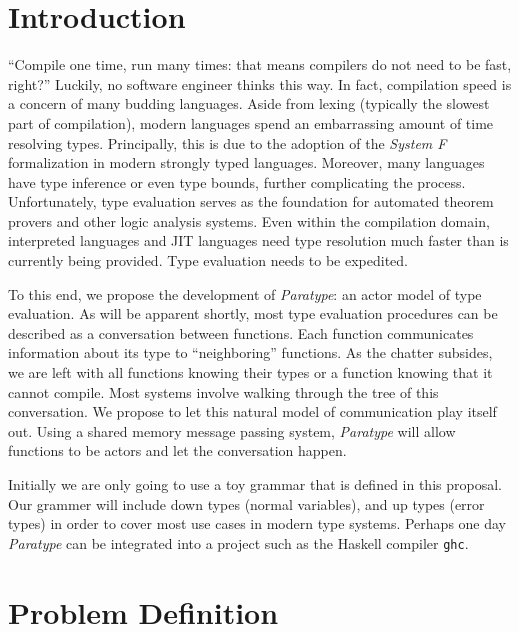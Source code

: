 \documentclass{acm_proc_article-sp}
\begin{document}


\section{Introduction}


``Compile one time, run many times: that means compilers do not need to be
fast, right?'' Luckily, no software engineer thinks this way. In fact,
compilation speed is a concern of many budding languages. Aside from lexing
(typically the slowest part of compilation), modern
languages spend an embarrassing amount of time resolving
types. Principally, this is due to the adoption of the
\emph{System F} formalization in modern strongly typed languages. Moreover,
many languages have type inference or even type bounds, further complicating
the process. Unfortunately, type evaluation serves as the foundation for
automated theorem provers and other logic analysis systems. Even within the
compilation domain, interpreted languages and JIT languages need type
resolution much faster than is currently being provided. Type evaluation needs
to be expedited.

To this end, we propose the development of \emph{Paratype}: an actor model of
type evaluation. As will be apparent shortly, most type evaluation procedures
can be described as a conversation between functions. Each function
communicates information about its type to ``neighboring'' functions. As the
chatter subsides, we are left with all functions knowing their types or a
function knowing that it cannot compile. Most systems involve walking through
the tree of this conversation. We propose to let this natural model of
communication play itself out. Using a shared memory message passing system,
\emph{Paratype} will allow functions to be actors and let the conversation
happen.

Initially we are only going to use a toy grammar that is defined in this
proposal. Our grammer will include down types (normal variables), and up types
(error types) in order to cover most use cases in modern type systems. Perhaps
one day \emph{Paratype} can be integrated into a project such as the Haskell
compiler \texttt{ghc}.


\section{Problem Definition}
\label{sec:problem}
\end{document}
